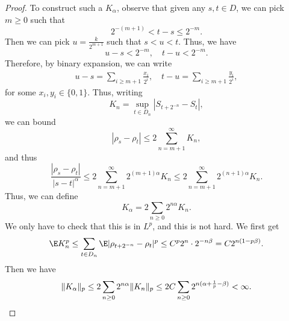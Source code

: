 \documentclass[a4paper]{article}
\begin{document}
\begin{proof}
  To construct such a $K_\alpha$, observe that given any $s, t \in D$, we can pick $m \geq 0$ such that
  \[
    2^{-(m+1)} < t - s \leq 2^{-m}.
  \]
  Then we can pick $u = \frac{k}{2^{m + 1}}$ such that $s < u < t$. Thus, we have
  \[
    u - s < 2^{-m},\quad t - u < 2^{-m}.
  \]
  Therefore, by binary expansion, we can write
  \begin{align*}
    u - s = \sum_{i \geq m + 1} \frac{x_i}{2^i},\quad t - u = \sum_{i \geq m + 1} \frac{y_i}{2^i},
  \end{align*}
  for some $x_i, y_i \in \{0, 1\}$. Thus, writing
  \[
    K_n = \sup_{t \in D_n} |S_{t + 2^{-n}} - S_t|,
  \]
  we can bound
  \[
    |\rho_s - \rho_t| \leq 2 \sum_{n = m + 1}^\infty K_n,
  \]
  and thus
  \[
    \frac{|\rho_s - \rho_t|}{|s - t|^\alpha} \leq 2 \sum_{n = m + 1}^\infty 2^{(m + 1) \alpha} K_n \leq 2 \sum_{n = m + 1}^\infty 2^{(n + 1) \alpha} K_n.
  \]
  Thus, we can define
  \[
    K_\alpha = 2 \sum_{n \geq 0} 2^{n\alpha} K_n.
  \]
  We only have to check that this is in $L^p$, and this is not hard. We first get
  \[
    \E K_n^p \leq \sum_{t \in D_n} \E |\rho_{t + 2^{-n}} - \rho_t|^p \leq C^p 2^n \cdot 2^{-n \beta} = C 2^{n(1 - p\beta)}.
  \]
  Then we have
  \[
    \|K_\alpha\|_p \leq 2 \sum_{n \geq 0}2^{n\alpha} \|K_n\|_p \leq 2C \sum_{n \geq 0} 2^{n(\alpha + \frac{1}{p} - \beta)} < \infty.\qedhere
  \]
%
\end{proof}
\end{document}
